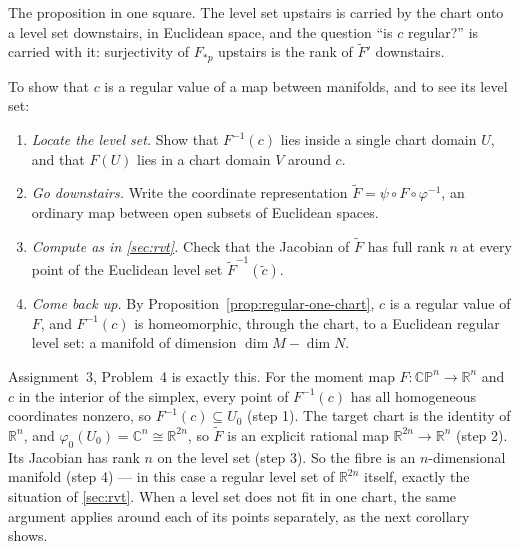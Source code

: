 \documentclass[11pt]{report}
\begin{document}
\begin{center}
\end{center}

The proposition in one square. The level set upstairs is carried by the chart onto a level set downstairs, in Euclidean space, and the question ``is $c$ regular?'' is carried with it: surjectivity of $F_{*p}$ upstairs is the rank of $\tilde F'$ downstairs.

\begin{rembox}\label{rem:strategy}
To show that $c$ is a regular value of a map between manifolds, and to see its level set:
\begin{enumerate}
    \item \emph{Locate the level set.} Show that $F^{-1}(c)$ lies inside a single chart domain $U$, and that $F(U)$ lies in a chart domain $V$ around $c$.
    \item \emph{Go downstairs.} Write the coordinate representation $\tilde F = \psi \circ F \circ \varphi^{-1}$, an ordinary map between open subsets of Euclidean spaces.
    \item \emph{Compute as in \ref{sec:rvt}.} Check that the Jacobian of $\tilde F$ has full rank $n$ at every point of the Euclidean level set $\tilde F^{-1}(\tilde c)$.
    \item \emph{Come back up.} By Proposition~\ref{prop:regular-one-chart}, $c$ is a regular value of $F$, and $F^{-1}(c)$ is homeomorphic, through the chart, to a Euclidean regular level set: a manifold of dimension $\dim M - \dim N$.
\end{enumerate}
Assignment~3, Problem~4 is exactly this. For the moment map $F : \mathbb{CP}^n \to \mathbb{R}^n$ and $c$ in the interior of the simplex, every point of $F^{-1}(c)$ has all homogeneous coordinates nonzero, so $F^{-1}(c) \subseteq U_0$ (step 1). The target chart is the identity of $\mathbb{R}^n$, and $\varphi_0(U_0) = \mathbb{C}^n \cong \mathbb{R}^{2n}$, so $\tilde F$ is an explicit rational map $\mathbb{R}^{2n} \to \mathbb{R}^n$ (step 2). Its Jacobian has rank $n$ on the level set (step 3). So the fibre is an $n$-dimensional manifold (step 4) --- in this case a regular level set of $\mathbb{R}^{2n}$ itself, exactly the situation of \ref{sec:rvt}. When a level set does not fit in one chart, the same argument applies around each of its points separately, as the next corollary shows.
\end{rembox}
\end{document}
